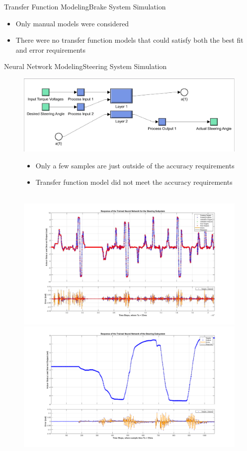 \documentclass{beamer}
\begin{document}
\begin{frame}{Transfer Function Modeling}{Brake System Simulation}
	\begin{block}{}
 		\begin{itemize}
			\item Only manual models were considered 
			\item There were no transfer function models that could satisfy both the best fit and error requirements 
 		\end{itemize}
  	\end{block}
\end{frame}

\begin{frame}{Neural Network Modeling}{Steering System Simulation}
	\begin{block}{}  		
  		\begin{figure}[H]
  			\centering \includegraphics[width=.45\linewidth , height=.37\textheight]{figs/img/steeringSimulinkBlock.jpg}\quad%
			\centering \begin{minipage}[b][0.4\textheight][c]{.45\linewidth}  \begin{itemize}
			\item Only a few samples are just outside of the accuracy requirements
			\item Transfer function model did not meet the accuracy requirements
			\end{itemize} \end{minipage}\\[1em]
			\centering \includegraphics[width=.45\linewidth , height=.37\textheight]{figs/img/steeringNeuralNetworkTrainedOutput.jpg}\quad%
			\centering \includegraphics[width=.45\linewidth , height=.37\textheight]{figs/img/steeringNeuralNetworkTrainedOutput2.jpg}
  		\end{figure}
	\end{block}
\end{frame}
\end{document}
